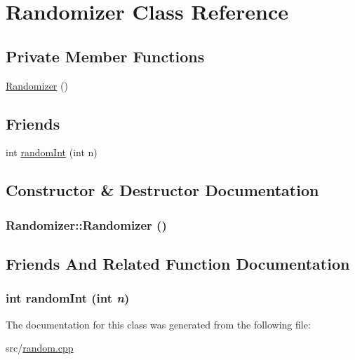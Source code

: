 \hypertarget{classRandomizer}{
\section{Randomizer Class Reference}
\label{classRandomizer}
}
\subsection*{Private Member Functions}
\begin{CompactItemize}
\item 
\hyperlink{classRandomizer_6f1e3b306ed5d631a73990c757e777c6}{Randomizer} ()
\end{CompactItemize}
\subsection*{Friends}
\begin{CompactItemize}
\item 
int \hyperlink{classRandomizer_54e4faa5b9beca41d7f101d5b7767950}{randomInt} (int n)
\end{CompactItemize}


\subsection{Constructor \& Destructor Documentation}
\hypertarget{classRandomizer_6f1e3b306ed5d631a73990c757e777c6}{
\subsubsection[{Randomizer}]{\setlength{\rightskip}{0pt plus 5cm}Randomizer::Randomizer ()}}
\label{classRandomizer_6f1e3b306ed5d631a73990c757e777c6}




\subsection{Friends And Related Function Documentation}
\hypertarget{classRandomizer_54e4faa5b9beca41d7f101d5b7767950}{
\subsubsection[{randomInt}]{\setlength{\rightskip}{0pt plus 5cm}int randomInt (int {\em n})}}
\label{classRandomizer_54e4faa5b9beca41d7f101d5b7767950}




The documentation for this class was generated from the following file:\begin{CompactItemize}
\item 
src/\hyperlink{random_8cpp}{random.cpp}\end{CompactItemize}
